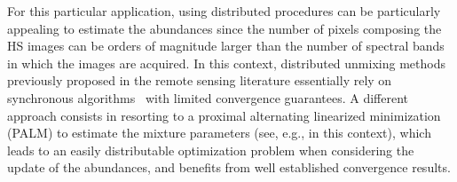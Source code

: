 \documentclass[journal,final,letterpaper,twoside,twocolumn]{IEEEtran}
\begin{document}
For this particular application, using distributed procedures can be particularly appealing to estimate the abundances since the number of pixels composing the HS images can be orders of magnitude larger than the number of spectral bands in which the images are acquired. In this context, distributed unmixing methods previously proposed in the remote sensing literature essentially rely on synchronous algorithms~\cite{Robila2013,Sigurdsson2016,Sigurdsson2017,Tsinos2017} with limited convergence guarantees. A different approach consists in resorting to a proximal alternating linearized minimization (PALM) \cite{Bolte2013,Chouzenoux2016} to estimate the mixture parameters (see, e.g., \cite{Repetti2014,Li2016,Thouvenin2015gretsi} in this context), which leads to an easily distributable optimization problem when considering the update of the abundances, and benefits from well established convergence results.
\end{document}
